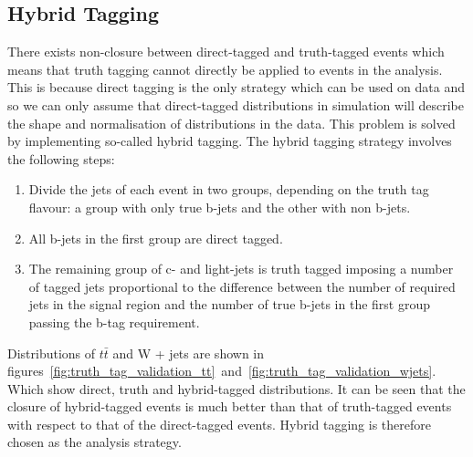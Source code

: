 \subsection{Hybrid Tagging}
\label{subsec:hybrid-tagging}
There exists non-closure between direct-tagged and truth-tagged events which
means that truth tagging cannot directly be applied to events in the analysis.
This is because direct tagging is the only strategy which can be used on data
and so we can only assume that direct-tagged distributions in simulation will
describe the shape and normalisation of distributions in the data. This problem
is solved by implementing so-called hybrid tagging. The hybrid tagging strategy
involves the following steps:
\begin{enumerate}
\item Divide the jets of each event in two groups, depending on the truth tag
  flavour: a group with only true b-jets and the other with non b-jets.
  
\item All b-jets in the first group are direct tagged.
  
\item  The remaining group of c- and light-jets is truth tagged imposing a
  number of tagged jets proportional to the difference between the number of
  required jets in the signal region and the number of true b-jets in the first
  group passing the b-tag requirement.
\end{enumerate}
Distributions of $t\bar{t}$ and W + jets are shown in
figures~\ref{fig:truth_tag_validation_tt}~and~\ref{fig:truth_tag_validation_wjets}.
Which show direct, truth and hybrid-tagged distributions. It can be seen that
the closure of hybrid-tagged events is much better than that of truth-tagged
events with respect to that of the direct-tagged events. Hybrid tagging is
therefore chosen as the analysis strategy.



